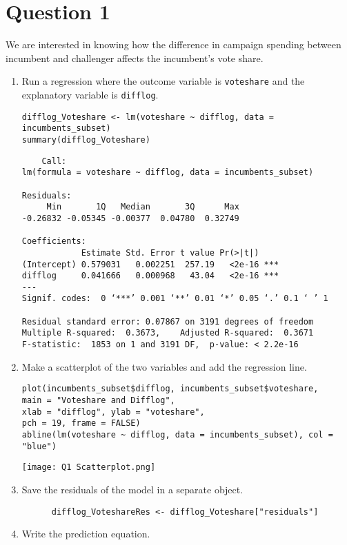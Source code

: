 \documentclass[12pt,letterpaper]{article}
\begin{document}
\section*{Question 1}
\vspace{.25cm}
\noindent We are interested in knowing how the difference in campaign spending between incumbent and challenger affects the incumbent's vote share. 
	\begin{enumerate}
		\item Run a regression where the outcome variable is \texttt{voteshare} and the explanatory variable is \texttt{difflog}.	\vspace{5cm}

  \begin{verbatim}
difflog_Voteshare <- lm(voteshare ~ difflog, data = incumbents_subset)
summary(difflog_Voteshare)
  \end{verbatim}

\begin{verbatim}
    Call:
lm(formula = voteshare ~ difflog, data = incumbents_subset)

Residuals:
     Min       1Q   Median       3Q      Max 
-0.26832 -0.05345 -0.00377  0.04780  0.32749 

Coefficients:
            Estimate Std. Error t value Pr(>|t|)    
(Intercept) 0.579031   0.002251  257.19   <2e-16 ***
difflog     0.041666   0.000968   43.04   <2e-16 ***
---
Signif. codes:  0 ‘***’ 0.001 ‘**’ 0.01 ‘*’ 0.05 ‘.’ 0.1 ‘ ’ 1

Residual standard error: 0.07867 on 3191 degrees of freedom
Multiple R-squared:  0.3673,	Adjusted R-squared:  0.3671 
F-statistic:  1853 on 1 and 3191 DF,  p-value: < 2.2e-16
\end{verbatim}

  
		\item Make a scatterplot of the two variables and add the regression line. 	
  \begin{verbatim}
plot(incumbents_subset$difflog, incumbents_subset$voteshare, 
main = "Voteshare and Difflog",
xlab = "difflog", ylab = "voteshare",
pch = 19, frame = FALSE)
abline(lm(voteshare ~ difflog, data = incumbents_subset), col = "blue")

  \end{verbatim}

  \texttt{[image: Q1 Scatterplot.png]}

  
		\item Save the residuals of the model in a separate object.
  \begin{verbatim}
      difflog_VoteshareRes <- difflog_Voteshare["residuals"]
  \end{verbatim}
		\item Write the prediction equation.
	\end{enumerate}
 
\end{document}
